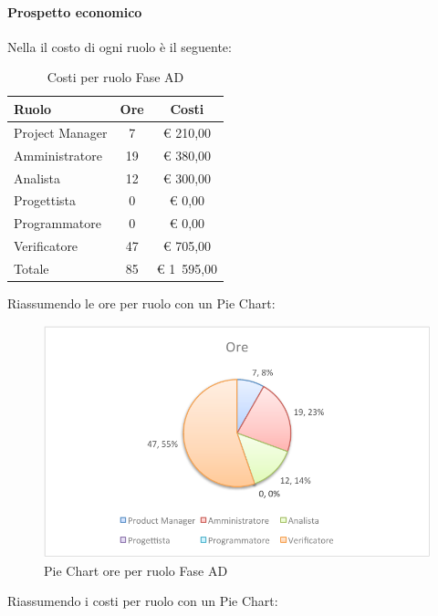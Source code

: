 			\paragraph{Prospetto economico}
				Nella  il costo di ogni ruolo è il seguente:
				\begin{table}[H]
					\begin{center}
						\begin{tabular}{| l | c | c |}
							\hline
							Ruolo 			& Ore 	& Costi  \\ \hline
							
							Project Manager	& 7 		& \euro{} 210,00 	\\
							Amministratore 		& 19 		& \euro{} 380,00 	\\
							Analista	 		& 12 		& \euro{} 300,00 	\\
							Progettista 		& 0		& \euro{} 0,00 	\\
							Programmatore		& 0		& \euro{} 0,00	\\
							Verificatore		& 47 		& \euro{} 705,00 	\\ \hline \hline
							
							Totale	 		& 85 		& \euro{} 1~595,00 	\\ \hline
						\end{tabular}
					\end{center}
					\caption{Costi per ruolo Fase AD}
				\end{table}
				Riassumendo le ore per ruolo con un Pie Chart:
				\begin{figure}[H]\centering
					\includegraphics[width=\textwidth]{PianoDiProgetto/Pics/ChartTotOreFaseAD.pdf}
					\caption{Pie Chart ore per ruolo Fase AD}
				\end{figure}
				Riassumendo i costi per ruolo con un Pie Chart:
